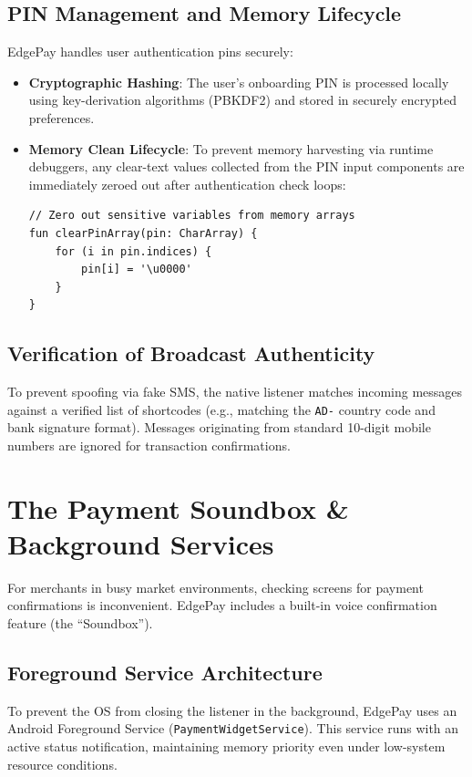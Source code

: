 \documentclass[10pt,journal,compsoc]{IEEEtran}
\begin{document}
\subsection{PIN Management and Memory Lifecycle}
EdgePay handles user authentication pins securely:
\begin{itemize}
    \item \textbf{Cryptographic Hashing}: The user's onboarding PIN is processed locally using key-derivation algorithms (PBKDF2) and stored in securely encrypted preferences.
    \item \textbf{Memory Clean Lifecycle}: To prevent memory harvesting via runtime debuggers, any clear-text values collected from the PIN input components are immediately zeroed out after authentication check loops:
\begin{lstlisting}[caption={Secure zero-fill operation in native memory.}]
// Zero out sensitive variables from memory arrays
fun clearPinArray(pin: CharArray) {
    for (i in pin.indices) {
        pin[i] = '\u0000'
    }
}
\end{lstlisting}
\end{itemize}

\subsection{Verification of Broadcast Authenticity}
To prevent spoofing via fake SMS, the native listener matches incoming messages against a verified list of shortcodes (e.g., matching the \texttt{AD-} country code and bank signature format). Messages originating from standard 10-digit mobile numbers are ignored for transaction confirmations.

\section{The Payment Soundbox \& Background Services}
For merchants in busy market environments, checking screens for payment confirmations is inconvenient. EdgePay includes a built-in voice confirmation feature (the ``Soundbox'').

\subsection{Foreground Service Architecture}
To prevent the OS from closing the listener in the background, EdgePay uses an Android Foreground Service (\texttt{PaymentWidgetService}). This service runs with an active status notification, maintaining memory priority even under low-system resource conditions.
\end{document}
